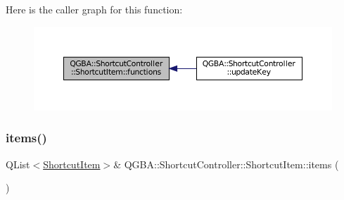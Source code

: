 Here is the caller graph for this function\+:
\nopagebreak
\begin{figure}[H]
\begin{center}
\leavevmode
\includegraphics[width=350pt]{class_q_g_b_a_1_1_shortcut_controller_1_1_shortcut_item_aa542632ee6a4bcfc84eac410da7a00a9_icgraph}
\end{center}
\end{figure}
\mbox{\label{class_q_g_b_a_1_1_shortcut_controller_1_1_shortcut_item_a9f7386270628d798905603ebc5c54bc0}} 
\subsubsection{\texorpdfstring{items()}{items()}\hspace{0.1cm}{\footnotesize\ttfamily [1/2]}}
{\footnotesize\ttfamily Q\+List$<$\mbox{\hyperlink{class_q_g_b_a_1_1_shortcut_controller_1_1_shortcut_item}{Shortcut\+Item}}$>$\& Q\+G\+B\+A\+::\+Shortcut\+Controller\+::\+Shortcut\+Item\+::items (\begin{DoxyParamCaption}{ }\end{DoxyParamCaption})\hspace{0.3cm}{\ttfamily [inline]}}

